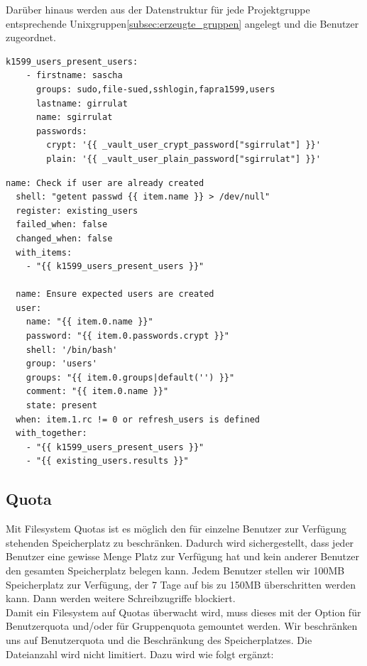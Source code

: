 Darüber hinaus werden aus der Datenstruktur  für jede Projektgruppe entsprechende Unixgruppen\ref{subsec:erzeugte_gruppen} angelegt und die Benutzer zugeordnet.

\begin{lstlisting}[label=code:syslog3,caption=Auszug aus ansible/group\_vars/file\_server/public]
  k1599_users_present_users:
    - firstname: sascha
      groups: sudo,file-sued,sshlogin,fapra1599,users
      lastname: girrulat
      name: sgirrulat
      passwords:
        crypt: '{{ _vault_user_crypt_password["sgirrulat"] }}'
        plain: '{{ _vault_user_plain_password["sgirrulat"] }}'
\end{lstlisting}

\begin{lstlisting}[label=code:syslog3,caption=Auszug aus der Datei ansible/roles/k1599\_users/tasks/main.yml]
  name: Check if user are already created
  shell: "getent passwd {{ item.name }} > /dev/null"
  register: existing_users
  failed_when: false
  changed_when: false
  with_items:
    - "{{ k1599_users_present_users }}"

  name: Ensure expected users are created
  user:
    name: "{{ item.0.name }}"
    password: "{{ item.0.passwords.crypt }}"
    shell: '/bin/bash'
    group: 'users'
    groups: "{{ item.0.groups|default('') }}"
    comment: "{{ item.0.name }}"
    state: present
  when: item.1.rc != 0 or refresh_users is defined
  with_together:
    - "{{ k1599_users_present_users }}"
    - "{{ existing_users.results }}"
\end{lstlisting}

\subsection{Quota}
Mit Filesystem Quotas ist es möglich den für einzelne Benutzer zur Verfügung
stehenden Speicherplatz zu beschränken. Dadurch wird sichergestellt, dass jeder
Benutzer eine gewisse Menge Platz zur Verfügung hat und kein anderer Benutzer
den gesamten Speicherplatz belegen kann. Jedem Benutzer stellen wir 100MB
Speicherplatz zur Verfügung, der 7 Tage auf bis zu 150MB überschritten werden
kann. Dann werden weitere Schreibzugriffe blockiert.\\

Damit ein Filesystem auf Quotas überwacht wird, muss dieses mit der Option
 für Benutzerquota und/oder  für Gruppenquota
gemountet werden. Wir beschränken uns auf Benutzerquota und die Beschränkung
des Speicherplatzes. Die Dateianzahl wird nicht limitiert. Dazu wird
 wie folgt ergänzt:\\

